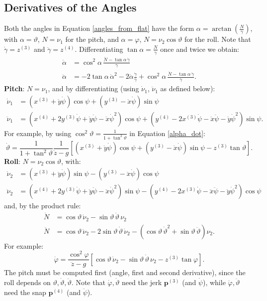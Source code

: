 \documentclass[10pt, a4paper]{report}
\begin{document}
\subsection{Derivatives of the Angles}
Both the angles in Equation \eqref{angles_from_flat} have the form $\alpha=\arctan\left(\frac{N}{\gamma}\right)$, with $\alpha=\vartheta$, $N=\nu_1$ for the pitch, and $\alpha=\varphi$, $N=\nu_2\cos\vartheta$ for the roll. Note that $\dot\gamma=z^{(3)}$ and $\ddot\gamma=z^{(4)}$. Differentiating $\tan\alpha=\frac{N}{\gamma}$ once and twice we obtain:\begin{align}
    \dot\alpha&=\cos^2\alpha\,\frac{\dot N-\tan\alpha\,\dot\gamma}{\gamma}\label{alpha_dot}\\
    \ddot\alpha&=-2\tan\alpha\,\dot\alpha^2-2\dot\alpha\frac{\dot\gamma}{\gamma}+\cos^2\alpha\,\frac{\ddot N-\tan\alpha\,\ddot\gamma}{\gamma}.\label{alpha_ddot}
\end{align}
\textbf{Pitch}: $N=\nu_1$, and by differentiating (using $\dot\nu_1$, $\ddot\nu_1$ as defined below):\begin{align}
    \dot\nu_1&=\left(x^{(3)}+\ddot y\dot\psi\right)\cos\psi+\left(y^{(3)}-\ddot x\dot\psi\right)\sin\psi\\
    \ddot\nu_1&=\left(x^{(4)}+2y^{(3)}\dot\psi+\ddot y\ddot\psi-\ddot x\dot\psi^2\right)\cos\psi+\left(y^{(4)}-2x^{(3)}\dot\psi-\ddot x\ddot\psi-\ddot y\dot\psi^2\right)\sin\psi.
\end{align}
For example, by using $\cos^2\vartheta=\frac{1}{1+\tan^2\vartheta}$ in Equation \eqref{alpha_dot}:\begin{equation}
    \dot\vartheta=\frac{1}{1+\tan^2\vartheta}\frac{1}{\ddot z-g}\left[\left(x^{(3)}+\ddot y\dot\psi\right)\cos\psi+\left(y^{(3)}-\ddot x\dot\psi\right)\sin\psi-z^{(3)}\tan\vartheta\right].
\end{equation}
\textbf{Roll}: $N=\nu_2\cos\vartheta$, with:\begin{align}
    \dot\nu_2&=\left(x^{(3)}+\ddot y\dot\psi\right)\sin\psi-\left(y^{(3)}-\ddot x\dot\psi\right)\cos\psi\\
    \ddot\nu_2&=\left(x^{(4)}+2y^{(3)}\dot\psi+\ddot y\ddot\psi-\ddot x\dot\psi^2\right)\sin\psi-\left(y^{(4)}-2x^{(3)}\dot\psi-\ddot x\ddot\psi-\ddot y\dot\psi^2\right)\cos\psi
\end{align}
and, by the product rule:\begin{align}
    \dot N&=\cos\vartheta\,\dot\nu_2-\sin\vartheta\,\dot\vartheta\,\nu_2\\
    \ddot N&=\cos\vartheta\,\ddot\nu_2-2\sin\vartheta\,\dot\vartheta\,\dot\nu_2-\left(\cos\vartheta\,\dot\vartheta^2+\sin\vartheta\,\ddot\vartheta\right)\nu_2.
\end{align}
For example:\begin{equation}
    \dot\varphi=\frac{\cos^2\varphi}{\ddot z-g}\left[\cos\vartheta\,\dot\nu_2-\sin\vartheta\,\dot\vartheta\,\nu_2-z^{(3)}\tan\varphi\right].
\end{equation}
The pitch must be computed first (angle, first and second derivative), since the roll depends on $\vartheta,\dot\vartheta,\ddot\vartheta$. Note that $\dot\varphi,\dot\vartheta$ need the jerk $\mathbf p^{(3)}$ (and $\dot\psi$), while $\ddot\varphi,\ddot\vartheta$ need the snap $\mathbf p^{(4)}$ (and $\ddot\psi$).
\end{document}
